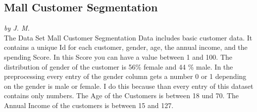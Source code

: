 \subsection{Mall Customer Segmentation}
\textit{by J. M.}\\

The Data Set Mall Customer Segmentation Data includes basic customer data. It contains a unique Id for each customer, gender, age, the annual income, and the spending Score. In this Score you can have a value between 1 and 100. The distribution of gender of the customer is 56\% female and 44 \% male. In the preprocessing every entry of the gender column gets a number 0 or 1 depending on the gender is male or female. I do this because than every entry of this dataset contains only numbers. The Age of the Customers is between 18 und 70. The Annual Income of the customers is between 15 and 127. 